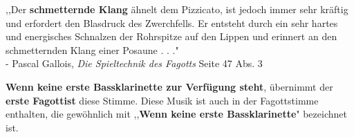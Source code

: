 \documentclass[12pt]{article}
\newcommand*\circled[1]{\tikz[baseline=(char.base)]{
            \node[shape=circle,draw,inner sep=1pt] (char) {#1};}}
\begin{document}
\begingroup
\begin{center}
,,Der \textbf{schmetternde Klang} ähnelt dem Pizzicato, ist jedoch immer sehr kräftig und erfordert den Blasdruck des Zwerchfells. Er entsteht durch ein sehr hartes und energisches Schnalzen der Rohrspitze auf den Lippen und erinnert an den schmetternden Klang einer Posaune . . ." \\

- Pascal Gallois, \textit{Die Spieltechnik des Fagotts} Seite 47 Abs. 3\\
\end{center}
\textbf{\circled{2} Wenn keine erste Bassklarinette zur Verfügung steht}, übernimmt der \textbf{erste Fagottist} diese Stimme. Diese Musik ist auch in der Fagottstimme enthalten, die gewöhnlich mit ,,\textbf{Wenn keine erste Bassklarinette}" bezeichnet ist.
\endgroup
\end{document}
